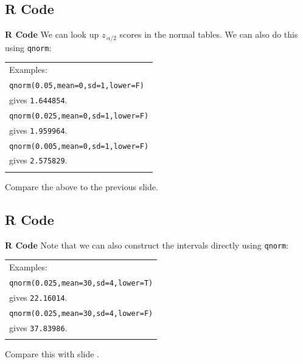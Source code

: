 \documentclass[compress]{beamer}        %
\makeatletter
\newcommand{\tcb}{\textcolor{beamer@blendedblue}}
\makeatother
\begin{document}
\subsection{R Code}
\begin{frame}{\bf \tcb{R Code}}
We can look up $z_{\,\alpha/2}$ scores in the normal tables. We can also do this using \texttt{qnorm}:\\[0.3cm]

\begin{tabular}{|l|}
\hline
Examples: \\[0.2cm]
\texttt{qnorm(0.05,mean=0,sd=1,lower=F)} \\
gives \texttt{1.644854}.\\[0.2cm]
\texttt{qnorm(0.025,mean=0,sd=1,lower=F)} \\
gives \texttt{1.959964}.\\[0.2cm]
\texttt{qnorm(0.005,mean=0,sd=1,lower=F)} \\
gives \texttt{2.575829}.\\[0.2cm]
\hline
\multicolumn{1}{c}{}\\[0.0cm]
\end{tabular}

Compare the above to the previous slide.

\end{frame}



\subsection{R Code}
\begin{frame}{\bf \tcb{R Code}}
Note that we can also construct the intervals directly using \texttt{qnorm}:\\[0.3cm]

\begin{tabular}{|l|}
\hline
Examples: \\[0.2cm]
\texttt{qnorm(0.025,mean=30,sd=4,lower=T)} \\
gives \texttt{22.16014}.\\[0.2cm]
\texttt{qnorm(0.025,mean=30,sd=4,lower=F)} \\
gives \texttt{37.83986}.\\[0.2cm]
\hline
\multicolumn{1}{c}{}\\[0.0cm]
\end{tabular}

Compare this with slide \pageref{salary95int}.


\end{frame}
\end{document}
